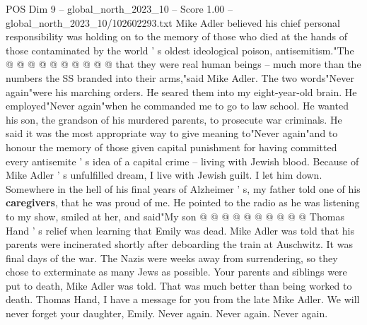 \begin{textsample}{POS Dim 9 – global\_north\_2023\_10 – Score 1.00 – global\_north\_2023\_10/102602293.txt}
Mike Adler believed his chief personal responsibility was holding on to the memory of those who died at the hands of those contaminated by the world ' s oldest ideological poison, antisemitism."The @ @ @ @ @ @ @ @ @ @ that they were real human beings -- much more than the numbers the SS branded into their arms,"said Mike Adler.
The two words"Never again"were his marching orders.
He seared them into my eight-year-old brain.
He employed"Never again"when he commanded me to go to law school.
He wanted his son, the grandson of his murdered parents, to prosecute war criminals.
He said it was the most appropriate way to give meaning to"Never again"and to honour the memory of those given capital punishment for having committed every antisemite ' s idea of a capital crime -- living with Jewish blood.
Because of Mike Adler ' s unfulfilled dream, I live with Jewish guilt.
I let him down.
Somewhere in the hell of his final years of Alzheimer ' s, my father told one of his \textbf{caregivers}, that he was proud of me.
He pointed to the radio as he was listening to my show, smiled at her, and said"My son @ @ @ @ @ @ @ @ @ @ Thomas Hand ' s relief when learning that Emily was dead.
Mike Adler was told that his parents were incinerated shortly after deboarding the train at Auschwitz.
It was final days of the war.
The Nazis were weeks away from surrendering, so they chose to exterminate as many Jews as possible.
Your parents and siblings were put to death, Mike Adler was told.
That was much better than being worked to death.
Thomas Hand, I have a message for you from the late Mike Adler.
We will never forget your daughter, Emily.
Never again.
Never again.
Never again.

\end{textsample}
